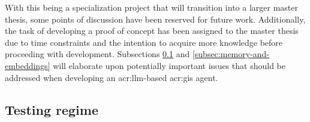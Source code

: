 With this being a specialization project that will transition into a larger master thesis, some points of discussion have been reserved for future work. Additionally, the task of developing a proof of concept has been assigned to the master thesis due to time constraints and the intention to acquire more knowledge before proceeding with development. Subsections \ref{subsec:testing-regime} and \ref{subsec:memory-and-embeddings} will elaborate upon potentially important issues that should be addressed when developing an \acrshort{acr:llm}-based \acrshort{acr:gis} agent.




\subsection{Testing regime}\label{subsec:testing-regime}

